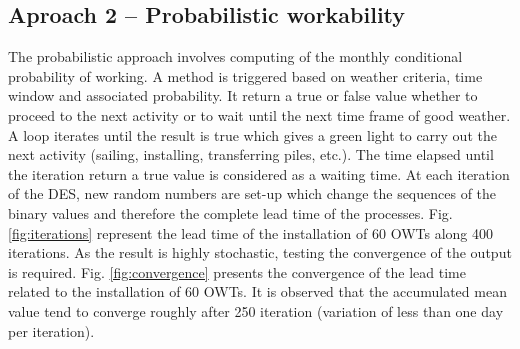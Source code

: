 \subsection{Aproach 2 -- Probabilistic workability}
The probabilistic approach involves computing of the monthly conditional probability of working. A method is triggered based on weather criteria, time window and associated probability. It return a true or false value whether to proceed to the next activity or to wait until the next time frame of good weather. A loop iterates until the result is true which gives a green light to carry out the next activity (sailing, installing, transferring piles, etc.). The time elapsed until the iteration return a true value is considered as a waiting time. At each iteration of the DES, new random numbers are set-up which change the sequences of the binary values and therefore the complete lead time of the processes. Fig. \ref{fig:iterations} represent the lead time of the installation of 60 OWTs along 400 iterations. As the result is highly stochastic, testing the convergence of the output is required. Fig. \ref{fig:convergence} presents the convergence of the lead time related to the installation of 60 OWTs. It is observed that the accumulated mean value tend to converge roughly after 250 iteration (variation of less than one day per iteration).
